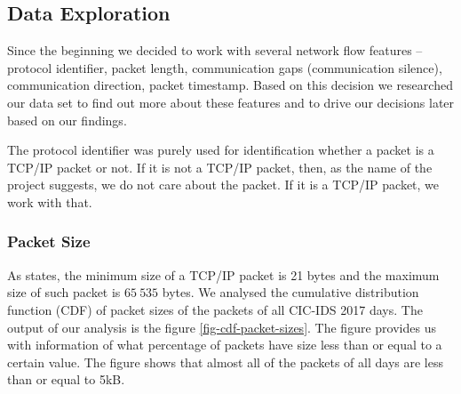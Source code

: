 \documentclass{article}
\begin{document}
\subsection{Data Exploration}\label{sec-dataset-exploration}
Since the beginning we decided to work with several network flow features -- protocol identifier, packet length, communication gaps (communication silence), communication direction, packet timestamp. Based on this decision we researched our data set to find out more about these features and to drive our decisions later based on our findings.

The protocol identifier was purely used for identification whether a packet is a TCP/IP packet or not. If it is not a TCP/IP packet, then, as the name of the project suggests, we do not care about the packet. If it is a TCP/IP packet, we work with that.

\subsubsection{Packet Size}
As \cite{oreilly-tcp} states, the minimum size of a TCP/IP packet is 21 bytes and the maximum size of such packet is $65\ 535$ bytes. We analysed the cumulative distribution function (CDF) of packet sizes of the packets of all CIC-IDS 2017 days. The output of our analysis is the figure \ref{fig-cdf-packet-sizes}. The figure provides us with information of what percentage of packets have size less than or equal to a certain value. The figure shows that almost all of the packets of all days are less than or equal to 5kB.
\end{document}
